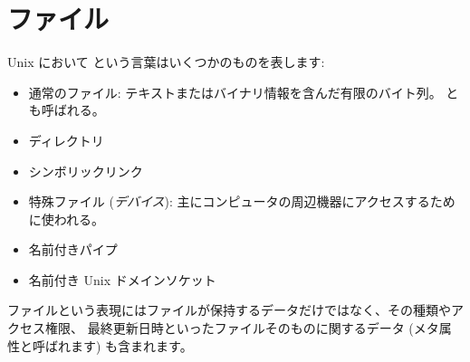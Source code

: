 %
%

\chapter{\label{sec/files}ファイル}

Unix において  という言葉はいくつかのものを表します:
%
\begin{itemize}
\item 通常のファイル: テキストまたはバイナリ情報を含んだ有限のバイト列。  とも呼ばれる。
%
\item ディレクトリ
%
\item シンボリックリンク
%
\item 特殊ファイル (\emph{デバイス}): 主にコンピュータの周辺機器にアクセスするために使われる。
%
\item 名前付きパイプ
%
\item 名前付き Unix ドメインソケット
\end{itemize}
%
ファイルという表現にはファイルが保持するデータだけではなく、その種類やアクセス権限、
最終更新日時といったファイルそのものに関するデータ (メタ属性と呼ばれます) も含まれます。

